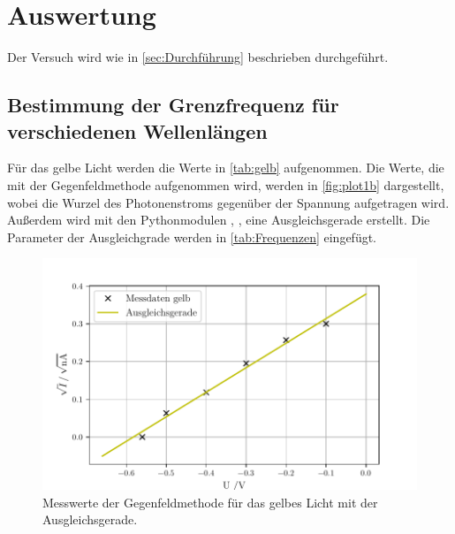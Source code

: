 \section{Auswertung}
\label{sec:Auswertung}
Der Versuch wird wie in \autoref{sec:Durchführung} beschrieben durchgeführt.

\subsection{Bestimmung der Grenzfrequenz für verschiedenen Wellenlängen} %
\label{sub:Grenzfrequenz_aus}

Für das gelbe Licht werden die Werte in \autoref{tab:gelb} aufgenommen. 
Die Werte, die mit der Gegenfeldmethode aufgenommen wird, werden in \autoref{fig:plot1b} dargestellt, wobei die Wurzel des Photonenstroms
gegenüber der Spannung aufgetragen wird. Außerdem wird mit den Pythonmodulen \cite{matplotlib}, \cite{numpy}, \cite{uncertainties}
eine Ausgleichsgerade erstellt. Die Parameter der Ausgleichgrade werden in \autoref{tab:Frequenzen} eingefügt.
\begin{figure}[H]
  \centering
  \includegraphics[width=\textwidth]{build/plot1b.pdf}
  \caption{Messwerte der Gegenfeldmethode für das gelbes Licht mit der Ausgleichsgerade.}
  \label{fig:plot1b}
\end{figure}
